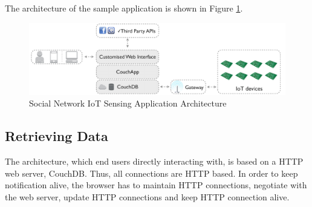 The architecture of the sample application is shown in Figure \ref{fig:data-centre-architecture}.

\begin{figure}[ht]
  \begin{center}
    \includegraphics[width=1\textwidth]{images/data-centre-architecture.pdf}
    \caption{Social Network IoT Sensing Application Architecture \cite{francesco2012storage}}
    \label{fig:data-centre-architecture}
  \end{center}
\end{figure}

\subsection{Retrieving Data}
The architecture, which end users directly interacting with, is based on a HTTP web server, CouchDB. Thus, all connections are HTTP based. In order to keep notification alive, the browser has to maintain HTTP connections, negotiate with the web server, update HTTP connections and keep HTTP connection alive. 


 